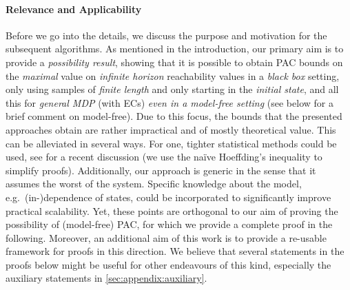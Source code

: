 \documentclass{article}
\begin{document}
\paragraph{Relevance and Applicability}
Before we go into the details, we discuss the purpose and motivation for the subsequent algorithms.
As mentioned in the introduction, our primary aim is to provide a \emph{possibility result}, showing that it is possible to obtain PAC bounds on the \emph{maximal} value on \emph{infinite horizon} reachability values in a \emph{black box} setting, only using samples of \emph{finite length} and only starting in the \emph{initial state}, and all this for \emph{general MDP} (with ECs) \emph{even in a model-free setting} (see below for a brief comment on model-free).
Due to this focus, the bounds that the presented approaches obtain are rather impractical and of mostly theoretical value.
This can be alleviated in several ways.
For one, tighter statistical methods could be used, see \cite{DBLP:journals/corr/abs-2404-05424} for a recent discussion (we use the na\"ive Hoeffding's inequality to simplify proofs).
Additionally, our approach is generic in the sense that it assumes the worst of the system.
Specific knowledge about the model, e.g.\ (in-)dependence of states, could be incorporated to significantly improve practical scalability.
Yet, these points are orthogonal to our aim of proving the possibility of (model-free) PAC, for which we provide a complete proof in the following.
Moreover, an additional aim of this work is to provide a re-usable framework for proofs in this direction.
We believe that several statements in the proofs below might be useful for other endeavours of this kind, especially the auxiliary statements in \cref{sec:appendix:auxiliary}.
\end{document}
